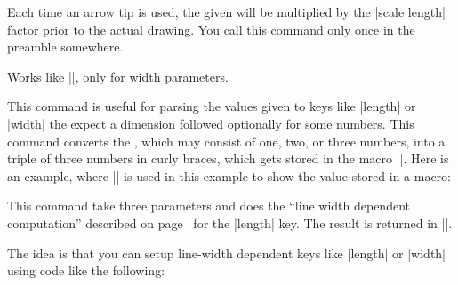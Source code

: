 \begin{command}{\pgfarrowsaddtolengthscalelist{}}
    Each time an arrow tip is used, the given  will be
    multiplied by the |scale length| factor prior to the actual drawing. You
    call this command only once in the preamble somewhere.
\end{command}

\begin{command}{\pgfarrowsaddtowidthscalelist{}}
    Works like |\pgfarrowsaddtolengthscalelist|, only for width parameters.
\end{command}


\begin{command}{\pgfarrowsthreeparameters{}}
    This command is useful for parsing the values given to keys like |length|
    or |width| the expect a dimension followed optionally for some numbers.
    This command converts the ,
    which may consist of one, two, or three numbers, into a triple of three
    numbers in curly braces, which gets stored in the macro
    |\pgfarrowstheparameters|. Here is an example, where |\showvalueofmacro| is
    used in this example to show the value stored in a macro:
\begin{codeexample}
    \makeatletter
    \def\showvalueofmacro#1{%
        \texttt{\expandafter\expandafter\expandafter\expandafter\expandafter\expandafter\expandafter\pgfutil@gobble\expandafter\expandafter\expandafter\string\expandafter\csname#1\endcsname}
    }%
\end{codeexample}
%
\begin{codeexample}[]
\showvalueofmacro\pgfarrowstheparameters
\end{codeexample}
\end{command}

\begin{command}{\pgfarrowslinewidthdependent{}}
    This command take three parameters and does the ``line width dependent
    computation'' described on page~\pageref{length-arrow-key} for the |length|
    key. The result is returned in |\pgf@x|.

    The idea is that you can setup line-width dependent keys like |length| or
    |width| using code like the following:
\begin{codeexample}[code only]
\pgfkeys{/pgf/arrow keys/depth/.code={%
  \pgfarrowsthreeparameters{#1}%
  \expandafter\pgfarrowsaddtolateoptions\expandafter{%
    \expandafter\pgfarrowslinewidthdependent\pgfarrowstheparameters%
    \pgfarrowdepth\pgf@x%
  }%
}
\end{codeexample}
\end{command}

